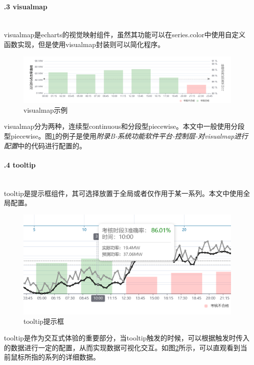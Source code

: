 \documentclass[winfonts,UTF8,a4paper]{ctexart}
\begin{document}
\paragraph{\thesubsubsection.3 visualmap}\ \\

visualmap是echarts的视觉映射组件，虽然其功能可以在series.color中使用自定义函数实现，但是使用visualmap封装则可以简化程序。
\begin{figure}[H]
	\centering
	\includegraphics[width=0.8\linewidth]{pic/screenshot003}
	\caption{visualmap示例}
	\label{fig:screenshot003}
\end{figure}

visualmap分为两种，连续型continuous和分段型piecewise。本文中一般使用分段型piecewise。图\ref{fig:screenshot003}的例子是使用\textit{附录B-系统功能软件平台-控制层-对visualmap进行配置}中的代码进行配置的。




\paragraph{\thesubsubsection.4 tooltip}\ \\

tooltip是提示框组件，其可选择放置于全局或者仅作用于某一系列。本文中使用全局配置。

\begin{figure}[H]
	\centering
	\includegraphics[width=0.8\linewidth]{pic/screenshot001}
	\caption{tooltip提示框}
	\label{fig:screenshot001}
\end{figure}

tooltip是作为交互式体验的重要部分，当tooltip触发的时候，可以根据触发时传入的数据进行一定的配置，从而实现数据可视化交互。如图\ref{fig:screenshot001}所示，可以直观看到当前鼠标所指的系列的详细数据。
\end{document}
